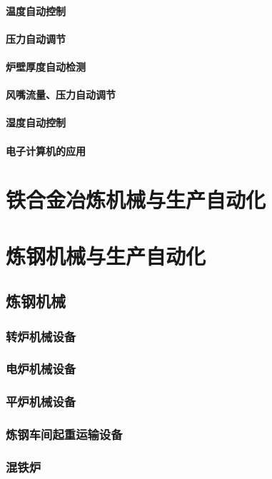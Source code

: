 \documentclass[UTF8]{../../ApplicationUniverse}
\begin{document}
            \paragraph{温度自动控制}
            \paragraph{压力自动调节}
            \paragraph{炉壁厚度自动检测}
            \paragraph{风嘴流量、压力自动调节}
            \paragraph{湿度自动控制}
            \paragraph{电子计算机的应用}
\section{铁合金冶炼机械与生产自动化}
\section{炼钢机械与生产自动化}
    \subsection{炼钢机械}
        \subsubsection{转炉机械设备}
        \subsubsection{电炉机械设备}
        \subsubsection{平炉机械设备}
        \subsubsection{炼钢车间起重运输设备}
        \subsubsection{混铁炉}
\end{document}
